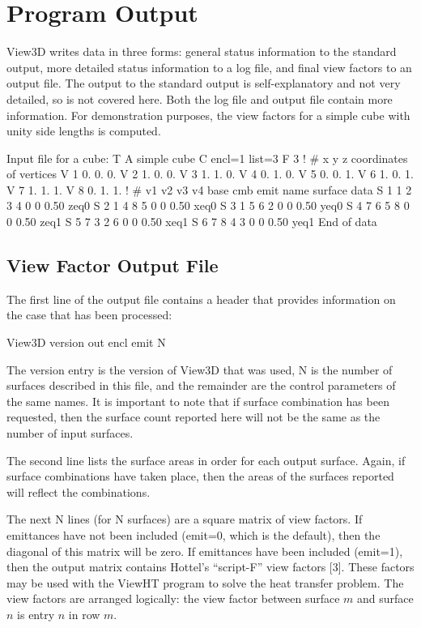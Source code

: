 \documentclass[10pt]{article}
\begin{document}
\section{Program Output}
View3D writes data in three forms: general status information to the standard
output, more detailed status information to a log file, and final view factors
to an output file.  The output to the standard output is self-explanatory and
not very detailed, so is not covered here.  Both the log file and output file
contain more information.  For demonstration purposes, the view factors for a
simple cube with unity side lengths is computed.

\begin{vs3file}
Input file for a cube:
T A simple cube
C encl=1 list=3
F 3
!  #   x    y    z      coordinates of vertices
V  1   0.   0.   0.
V  2   1.   0.   0.
V  3   1.   1.   0.
V  4   0.   1.   0.
V  5   0.   0.   1.
V  6   1.   0.   1.
V  7   1.   1.   1.
V  8   0.   1.   1.
!  #   v1  v2  v3  v4 base cmb  emit  name      surface data
S  1    1   2   3   4   0   0   0.50  zeq0
S  2    1   4   8   5   0   0   0.50  xeq0
S  3    1   5   6   2   0   0   0.50  yeq0
S  4    7   6   5   8   0   0   0.50  zeq1
S  5    7   3   2   6   0   0   0.50  xeq1
S  6    7   8   4   3   0   0   0.50  yeq1
End of data
\end{vs3file}

\subsection{View Factor Output File}
The first line of the output file contains a header that provides information
on the case that has been processed:

\begin{results}
View3D version out encl emit N
\end{results}

\noindent
The version entry is the version of View3D that was used, N is the number of
surfaces described in this file, and the remainder are the control parameters
of the same names.  It is important to note that if surface combination has
been requested, then the surface count reported here will not be the same as
the number of input surfaces.  

The second line lists the surface areas in order for each output surface.  
Again, if surface combinations have taken place, then the areas of the surfaces
reported will reflect the combinations.

The next N lines (for N surfaces) are a square matrix of view factors.  If
emittances have not been included (emit=0, which is the default), then the
diagonal of this matrix will be zero.  If emittances have been included 
(emit=1), then the output matrix contains Hottel’s ``script-F'' view factors
[3]. These factors may be used with the ViewHT program to solve the heat
transfer problem.  The view factors are arranged logically: the view factor
 between surface $m$ and surface $n$ is entry $n$ in row $m$.
\end{document}
